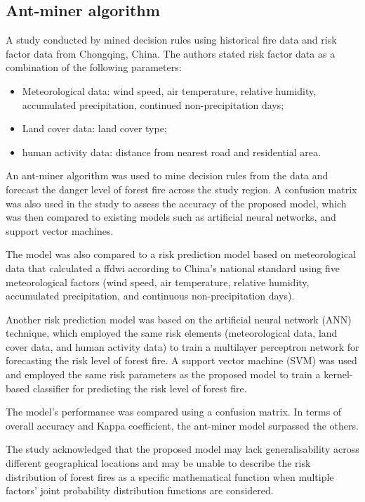 \subsection{Ant-miner algorithm}
A study conducted by \cite{ZHENG2020106772} mined decision rules using historical fire data and risk factor data from Chongqing, China. The authors stated risk factor data as a combination of the following parameters:
\begin{itemize}
    \item Meteorological data: wind speed, air temperature, relative humidity, accumulated precipitation, continued non-precipitation days;
    \item Land cover data: land cover type;
    \item human activity data: distance from nearest road and residential area.
\end{itemize}
An ant-miner algorithm was used to mine decision rules from the data and forecast the danger level of forest fire across the study region. A confusion matrix was also used in the study to assess the accuracy of the proposed model, which was then compared to existing models such as artificial neural networks, and support vector machines. 


The model was also compared to a risk prediction model based on meteorological data that calculated a \gls{ffdwi} according to China's national standard using five meteorological factors (wind speed, air temperature, relative humidity, accumulated precipitation, and continuous non-precipitation days). 


Another risk prediction model was based on the artificial neural network (ANN) technique, which employed the same risk elements (meteorological data, land cover data, and human activity data) to train a multilayer perceptron network for forecasting the risk level of forest fire. A support vector machine (SVM) was used and employed the same risk parameters as the proposed model to train a kernel-based classifier for predicting the risk level of forest fire.


The model's performance was compared using a confusion matrix. In terms of overall accuracy and Kappa coefficient, the ant-miner model surpassed the others.




The study acknowledged that the proposed model may lack generalisability across different geographical locations and may be unable to describe the risk distribution of forest fires as a specific mathematical function when multiple factors' joint probability distribution functions are considered.


